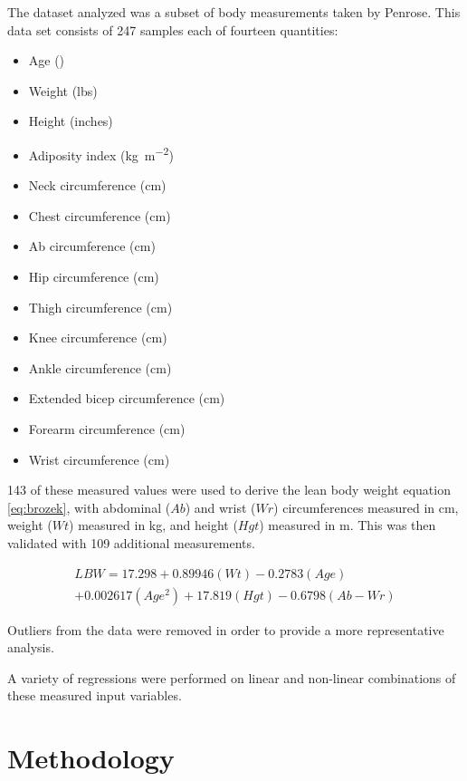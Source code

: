 \documentclass{IEEEtran}
\begin{document}
The dataset analyzed was a subset of body measurements taken by Penrose\cite{Penrose1985}. This data set consists of 247 samples each of fourteen quantities:

\begin{itemize}
	\item Age (\si{\year})
	\item Weight (lbs)
	\item Height (inches)
	\item Adiposity index (\si{\kilo\gram\per\meter^2})
	\item Neck circumference (\si{\centi\meter})
	\item Chest circumference (\si{\centi\meter})
	\item Ab circumference (\si{\centi\meter})
	\item Hip circumference (\si{\centi\meter})
	\item Thigh circumference (\si{\centi\meter})
	\item Knee circumference (\si{\centi\meter})
	\item Ankle circumference (\si{\centi\meter})
	\item Extended bicep circumference (\si{\centi\meter})
	\item Forearm circumference (\si{\centi\meter})
	\item Wrist circumference (\si{\centi\meter})
\end{itemize}

\num{143} of these measured values were used to derive the lean body weight equation \eqref{eq:brozek}, with abdominal ($Ab$) and wrist ($Wr$) circumferences measured in \si{\centi\meter}, weight ($Wt$) measured in \si{\kilo\gram}, and height ($Hgt$) measured in \si{\meter}. This was then validated with \num{109} additional measurements.

\begin{multline}
	LBW = 17.298 + 0.89946 (Wt) - 0.2783 (Age) \\+ 0.002617 (Age^2) + 17.819 (Hgt) - 0.6798 (Ab - Wr) \label{eq:brozek}
\end{multline}

Outliers from the data were removed in order to provide a more representative analysis.

A variety of regressions were performed on linear and non-linear combinations of these measured input variables. 

\section{Methodology} 
\end{document}
